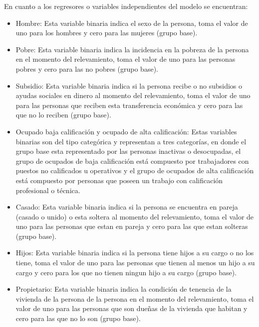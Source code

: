 \documentclass[12pt,a4paper]{article}
\begin{document}
En cuanto a los regresores o variables independientes del modelo se encuentran:
\begin{itemize}
\item Hombre: Esta variable binaria indica el sexo de la persona, toma el valor de uno para los hombres y cero para las mujeres (grupo base).
\item Pobre: Esta variable binaria indica la incidencia en la pobreza de la persona en el momento del relevamiento, toma el valor de uno para las personas pobres y cero para las no pobres (grupo base).
\item Subsidio: Esta variable binaria indica si la persona recibe o no  subsidios o ayudas sociales en dinero al momento del relevamiento, toma el valor de uno para las personas que reciben esta transferencia económica y cero para las que no lo reciben (grupo base).
\item Ocupado baja calificación y ocupado de alta calificación: Estas variables binarias son del tipo categórica y representan a tres categorías, en donde el grupo base esta representado por las personas inactivas o desocupadas, el grupo de ocupados de baja calificación está compuesto por trabajadores con puestos no calificados u operativos y el grupo de ocupados de alta calificación está compuesto por personas que poseen un trabajo con calificación profesional o técnica.
\item Casado: Esta variable binaria indica si la persona se encuentra en pareja (casado o unido) o esta soltera al momento del relevamiento, toma el valor de uno para las personas que estan en pareja y cero para las que estan solteras (grupo base).
\item Hijos: Esta variable binaria indica si la persona tiene hijos a su cargo o no los tiene, toma el valor de uno para las personas que tienen al menos un hijo a su cargo y cero para los que no tienen ningun hijo a su cargo (grupo base). 
\item Propietario: Esta variable binaria indica la condición de tenencia de la vivienda de la persona de la persona en el momento del relevamiento, toma el valor de uno para las personas que son dueñas de la vivienda que habitan y cero para las que no lo son (grupo base).

\end{itemize}
\end{document}
